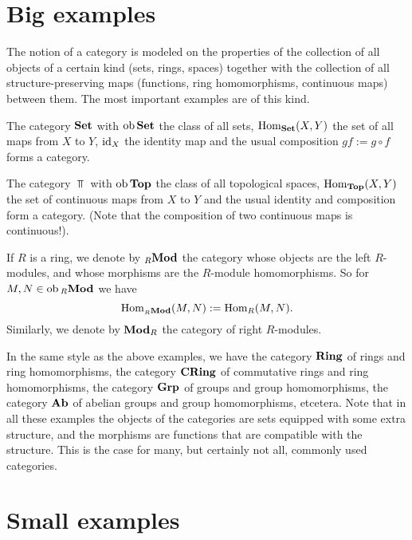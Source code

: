 \section{Big examples}\label{sec:big-examples}

The notion of a category is modeled on the properties of the collection of all objects of a certain kind (sets, rings, spaces) together with the collection of all structure-preserving maps (functions, ring homomorphisms, continuous maps) between them. The most important examples are of this kind.

\begin{example} The category $\mathbf{Set}$ with $\operatorname{ob} \mathbf{Set}$ the class of all sets,  $\operatorname{Hom}_{\mathbf{Set}}(X,Y)$ the set of all maps from $X$ to $Y$, ${\rm id}_X$ the identity map and the usual composition $gf:= g \circ f$ forms a category.
\end{example}

\begin{example} The category $\Top$ with $\operatorname{ob} \mathbf{Top}$ the class of all topological spaces, $\operatorname{Hom}_{\mathbf{Top}}(X,Y)$ the set of continuous maps from $X$ to $Y$ and the usual identity and composition form a category. (Note that the composition of two continuous maps is continuous!).
\end{example}

\begin{example} If $R$ is a ring, we denote by ${}_R\mathbf{Mod}$ the category whose objects are the left  $R$-modules, and whose morphisms are the $R$-module homomorphisms. So for $M,N \in \operatorname{ob} {}_R\mathbf{Mod}$ we have
\[
	\operatorname{Hom}_{{}_R\mathbf{Mod}}( M, N ) := \operatorname{Hom}_R( M, N ).
\]
Similarly, we denote by $\mathbf{Mod}_R$ the category of right $R$-modules.
\end{example}


In the same style as the above examples, we have the category $\mathbf{Ring}$ of rings and ring homomorphisms, the category $\mathbf{CRing}$ of commutative rings and ring homomorphisms, the category $\mathbf{Grp}$ of groups and group homomorphisms, the category $\mathbf{Ab}$ of abelian groups and group homomorphisms, etcetera. Note that in all these examples the objects of the categories are sets equipped with some extra structure, and the morphisms are  functions that are compatible with the structure.  This is the case for many, but certainly not all, commonly used categories. 


\section{Small examples}\label{sec:small-examples}

